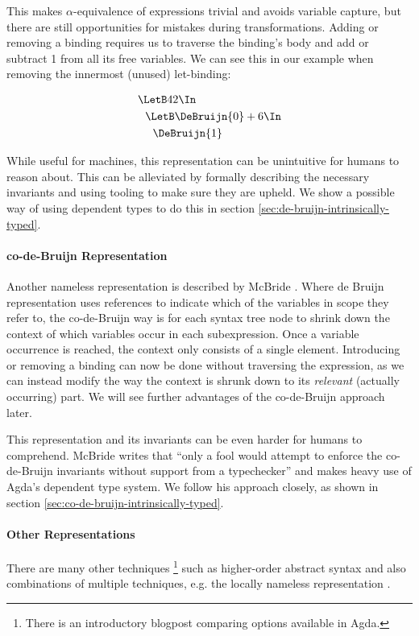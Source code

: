     This makes $\alpha$-equivalence of expressions trivial and avoids variable capture,
    but there are still opportunities for mistakes during transformations.
    Adding or removing a binding
    requires us to traverse the binding's body and add or subtract 1 from all its free variables.
    We can see this in our example when removing the innermost (unused) let-binding:

    \begin{align*}
      &\LetB 42 \In                   \\
      &\ \ \LetB \DeBruijn{0} + 6 \In \\
      &\ \ \ \ \DeBruijn{1}
    \end{align*}

    While useful for machines, this representation can be unintuitive for humans to reason about.
    This can be alleviated by formally describing the necessary invariants
    and using tooling to make sure they are upheld.
    We show a possible way of using dependent types to do this in section
    \ref{sec:de-bruijn-intrinsically-typed}.

  \paragraph{co-de-Bruijn Representation}
    Another nameless representation is described by McBride \cite{McBride2018EveryBodysGotToBeSomewhere}.
    Where de Bruijn representation uses references to indicate which of the variables in scope they refer to,
    the co-de-Bruijn way is for each syntax tree node
    to shrink down the context of which variables occur in each subexpression.
    Once a variable occurrence is reached, the context only consists of a single element.
    Introducing or removing a binding can now be done without traversing the expression,
    as we can instead modify the way the context is shrunk down to its \emph{relevant}
    (actually occurring) part.
    We will see further advantages of the co-de-Bruijn approach later.

    This representation and its invariants can be even harder for humans to comprehend.
    McBride writes that
    ``only a fool would attempt to enforce the co-de-Bruijn invariants without support
    from a typechecker''
    and makes heavy use of Agda's dependent type system.
    We follow his approach closely, as shown in section
    \ref{sec:co-de-bruijn-intrinsically-typed}.

  \paragraph{Other Representations}
    There are many other techniques%
    \footnote{
    There is an introductory blogpost
    \cite{Cockx2021RepresentationsBinding}
    comparing options available in Agda.
    }
    such as higher-order abstract syntax
    \cite{Pfenning1988HOAS}
    and also combinations of multiple techniques, e.g. the locally nameless representation
    \cite{Chargueraud2011LocallyNameless}.

